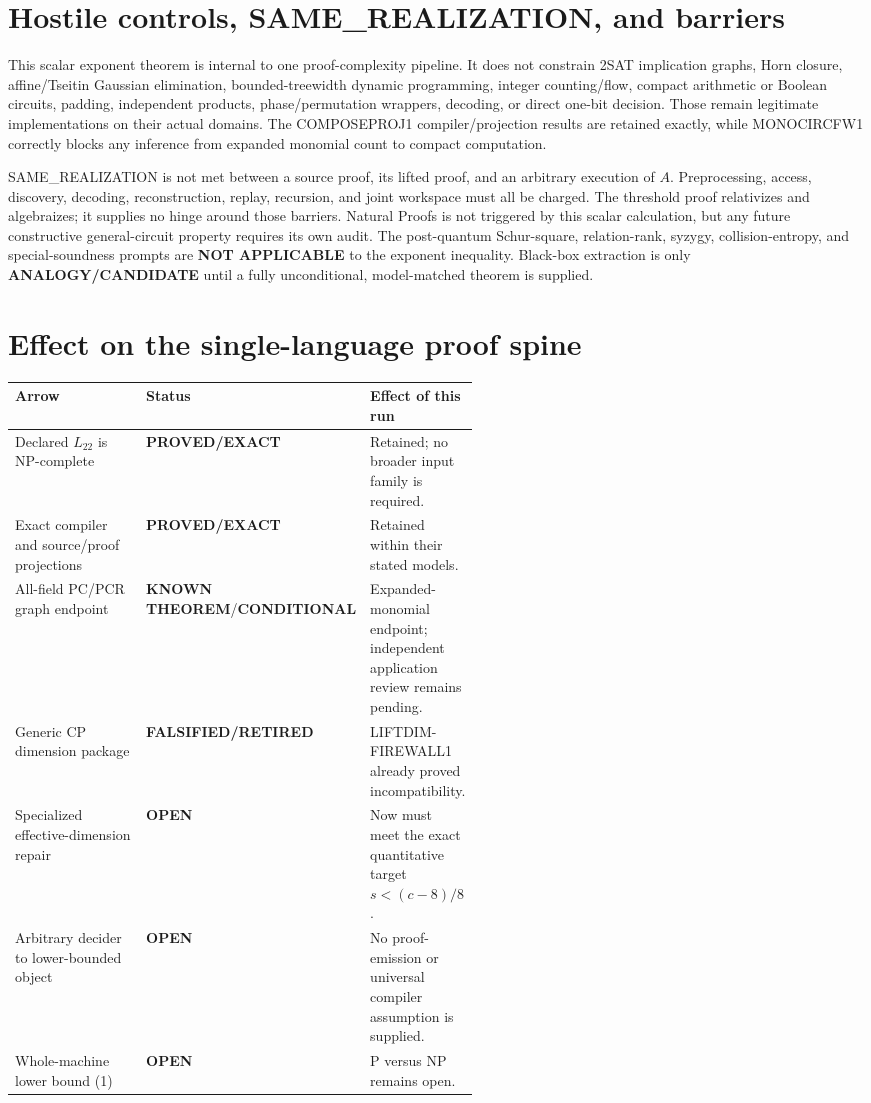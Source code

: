 \documentclass[11pt]{article}
\newcommand{\EXACT}{\textbf{PROVED/EXACT}}
\newcommand{\KNOWN}{\textbf{KNOWN THEOREM}}
\newcommand{\COND}{\textbf{CONDITIONAL}}
\newcommand{\OPEN}{\textbf{OPEN}}
\newcommand{\RET}{\textbf{FALSIFIED/RETIRED}}
\newcommand{\Ltwo}{L_{22}}
\begin{document}
\section{Hostile controls, SAME\_REALIZATION, and barriers}
This scalar exponent theorem is internal to one proof-complexity pipeline.
It does not constrain 2SAT implication graphs, Horn closure, affine/Tseitin
Gaussian elimination, bounded-treewidth dynamic programming, integer
counting/flow, compact arithmetic or Boolean circuits, padding, independent
products, phase/permutation wrappers, decoding, or direct one-bit decision.
Those remain legitimate implementations on their actual domains.  The
COMPOSEPROJ1 compiler/projection results are retained exactly, while
MONOCIRCFW1 correctly blocks any inference from expanded monomial count to
compact computation.

SAME\_REALIZATION is not met between a source proof, its lifted proof, and an
arbitrary execution of \(A\).  Preprocessing, access, discovery, decoding,
reconstruction, replay, recursion, and joint workspace must all be charged.
The threshold proof relativizes and algebraizes; it supplies no hinge around
those barriers.  Natural Proofs is not triggered by this scalar calculation,
but any future constructive general-circuit property requires its own audit.
The post-quantum Schur-square, relation-rank, syzygy, collision-entropy, and
special-soundness prompts are \textbf{NOT APPLICABLE} to the exponent
inequality.  Black-box extraction is only \textbf{ANALOGY/CANDIDATE} until a
fully unconditional, model-matched theorem is supplied.

\section{Effect on the single-language proof spine}
\begin{center}
\begin{tabularx}{0.98\linewidth}{@{}p{0.36\linewidth}p{0.18\linewidth}X@{}}
\toprule
Arrow & Status & Effect of this run\\
\midrule
Declared \(\Ltwo\) is NP-complete & \EXACT & Retained; no broader input family is required.\\
Exact compiler and source/proof projections & \EXACT & Retained within their stated models.\\
All-field PC/PCR graph endpoint & \KNOWN/\COND & Expanded-monomial endpoint; independent application review remains pending.\\
Generic CP dimension package & \RET & LIFTDIM-FIREWALL1 already proved incompatibility.\\
Specialized effective-dimension repair & \OPEN & Now must meet the exact quantitative target \(s<(c-8)/8\).\\
Arbitrary decider to lower-bounded object & \OPEN & No proof-emission or universal compiler assumption is supplied.\\
Whole-machine lower bound (1) & \OPEN & P versus NP remains open.\\
\bottomrule
\end{tabularx}
\end{center}
\end{document}
